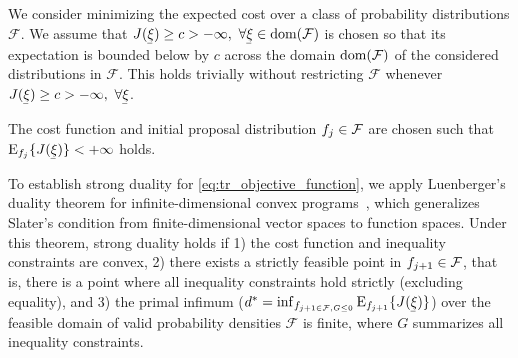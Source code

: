 \begin{assumption}
    \label{assumption:duality:on_cost}
    We consider minimizing the expected cost over a class of probability distributions $\mathcal{F}$.
    We assume that $J(\vVarCem)\ge c > -\infty,~ \forall \vVarCem \in \operatorfont{dom} (\mathcal{F})$ is chosen so that its expectation is bounded below by $c$ across the domain $\operatorfont{dom}(\mathcal{F})$ of the considered distributions in $\mathcal{F}$.
    This holds trivially without restricting $\mathcal{F}$ whenever $J(\vVarCem) \ge c > -\infty,~\forall \vVarCem$.
\end{assumption}
\begin{assumption}
    \label{assumption:duality:on_cost_and_proposal}
    The cost function and initial proposal distribution $f_j \in \mathcal{F}$ are chosen such that $\Eop_{\pdf_j}\{J(\vVarCem)\} < +\infty$ holds.
\end{assumption}

To establish strong duality for \cref{eq:tr_objective_function}, we apply Luenberger's duality theorem for infinite-dimensional convex programs~\cite[Sec.~8.6, Thm.~1]{luenbergerOptimizationVectorSpace1969}, which generalizes Slater's condition from finite-dimensional vector spaces to function spaces. Under this theorem, strong duality holds if 1) the cost function and inequality constraints are convex, 2) there exists a strictly feasible point in $f_{j+1}\in\mathcal{F}$, that is, there is a point where all inequality constraints hold strictly (excluding equality), and 3) the primal infimum ($d^*=\inf_{\pdf_{j+1\in \mathcal{F}, G\le0}} \Eop_{\pdf_{j+1}}\{J(\vVarCem)\}$) over the feasible domain of valid probability densities $\mathcal{F}$ is finite, where $G$ summarizes all inequality constraints.

